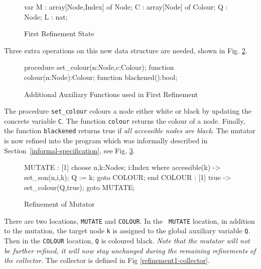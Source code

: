 \begin{figure}[htb]
\begin{smallsession}
  var
    M : array[Node,Index] of Node;
    C : array[Node] of Colour;
    Q : Node;
    L : nat;
\end{smallsession}
\caption{First Refinement State}
\label{refinement1-state}
\end{figure}

\noindent Three extra operations on this new data structure are needed,
shown in Fig. \ref{refinement1-functions}.

\begin{figure}[htb]
\begin{smallsession}
  procedure set_colour(n:Node,c:Colour);
  function  colour(n:Node):Colour;
  function  blackened():bool;
\end{smallsession}
\caption{Additional Auxiliary Functions used in First Refinement}
\label{refinement1-functions}
\end{figure}

The procedure {\tt set\_colour} colours a node either white or black by
updating the concrete variable {\tt C}\@.  
The function {\tt colour} returns the colour of a node. Finally, the function
{\tt blackened} returns true if {\em all accessible nodes are black}\@.
The  mutator is  now  refined  into  the program  which was informally
described   in    Section~\ref{informal-specification}, see Fig. \ref{refinement1-mutator}.

\begin{figure}[htb]
\begin{smallsession}
  MUTATE :
    [1] choose n,k:Nodes; i:Index where accessible(k) -> 
          set_son(n,i,k); 
          Q := k; 
          goto COLOUR;
        end
  COLOUR :  
    [1] true -> set_colour(Q,true); goto MUTATE;
\end{smallsession}
\caption{Refinement of Mutator}
\label{refinement1-mutator}
\end{figure}

There are two  locations, {\tt MUTATE} and {\tt  COLOUR}\@.  In the {\tt
  MUTATE} location,  in addition  to  the
mutation, the target node {\tt k} is assigned  to the global auxiliary
variable {\tt  Q}\@.   Then in the  {\tt COLOUR}   location,  {\tt Q} is
coloured black.    {\em Note that    the mutator will not  be  further
  refined, it will now stay unchanged during the remaining refinements
  of the collector}\@. The collector is defined in Fig \ref{refinement1-collector}.

